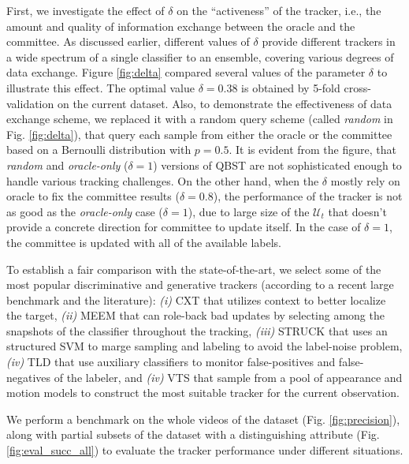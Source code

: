 \documentclass[10pt, conference, compsocconf]{IEEEtran}
\begin{document}
First, we investigate the effect of $\delta$ on the ``activeness'' of the tracker, i.e., the amount and quality of information exchange between the oracle and the committee. As discussed earlier, different values of $\delta$ provide different trackers in a wide spectrum of a single classifier to an ensemble, covering various degrees of data exchange. Figure \ref{fig:delta} compared several values of the parameter $\delta$ to illustrate this effect. The optimal value $\delta = 0.38$ is obtained by 5-fold cross-validation on the current dataset. Also, to demonstrate the effectiveness of data exchange scheme, we replaced it with a random query scheme (called \textit{random} in Fig. \ref{fig:delta}), that query each sample from either the oracle or the committee based on a Bernoulli distribution with $p = 0.5$. It is evident from the figure, that \textit{random} and \textit{oracle-only} ($\delta = 1$) versions of QBST are not sophisticated enough to handle various tracking challenges. On the other hand, when the $\delta$ mostly rely on oracle to fix the committee results ($\delta = 0.8$), the performance of the tracker is not as good as the \textit{oracle-only} case ($\delta = 1$), due to large size of the $\mathcal{U}_t$ that doesn't provide a concrete direction for committee to update itself. In the case of $\delta = 1$, the committee is updated with all of the available labels.

To establish a fair comparison with the state-of-the-art, we select some of the most popular discriminative and generative trackers (according to a recent large benchmark \cite{wu2013online} and the literature): \textit{(i)} CXT \cite{dinh2011context} that utilizes context to better localize the target, \textit{(ii)} MEEM \cite{zhang2014meem} that can role-back bad updates by selecting among the snapshots of the classifier throughout the tracking, \textit{(iii)} STRUCK \cite{hare2011struck} that uses an structured SVM to marge sampling and labeling to avoid the label-noise problem, \textit{(iv)} TLD \cite{kalal2012tracking} that use auxiliary classifiers to monitor false-positives and false-negatives of the labeler, and \textit{(iv)} VTS \cite{kwon2011tracking} that sample from a pool of appearance and motion models to construct the most suitable tracker for the current observation.

We perform a benchmark on the whole videos of the dataset (Fig. \ref{fig:precision}), along with partial subsets of the dataset with a distinguishing attribute (Fig. \ref{fig:eval_succ_all}) to evaluate the tracker performance under different situations. 
\end{document}
